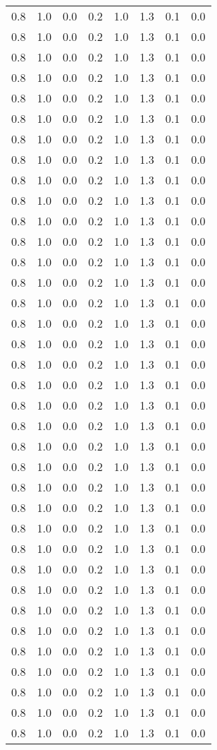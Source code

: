 \begin{tabular}{L{1in}|L{1in}|L{1in}|L{1in}|L{1in}|L{1in}|L{1in}|L{1in}}
0.8&1.0&0.0&0.2&1.0&1.3&0.1&0.0\\
0.8&1.0&0.0&0.2&1.0&1.3&0.1&0.0\\
0.8&1.0&0.0&0.2&1.0&1.3&0.1&0.0\\
0.8&1.0&0.0&0.2&1.0&1.3&0.1&0.0\\
0.8&1.0&0.0&0.2&1.0&1.3&0.1&0.0\\
0.8&1.0&0.0&0.2&1.0&1.3&0.1&0.0\\
0.8&1.0&0.0&0.2&1.0&1.3&0.1&0.0\\
0.8&1.0&0.0&0.2&1.0&1.3&0.1&0.0\\
0.8&1.0&0.0&0.2&1.0&1.3&0.1&0.0\\
0.8&1.0&0.0&0.2&1.0&1.3&0.1&0.0\\
0.8&1.0&0.0&0.2&1.0&1.3&0.1&0.0\\
0.8&1.0&0.0&0.2&1.0&1.3&0.1&0.0\\
0.8&1.0&0.0&0.2&1.0&1.3&0.1&0.0\\
0.8&1.0&0.0&0.2&1.0&1.3&0.1&0.0\\
0.8&1.0&0.0&0.2&1.0&1.3&0.1&0.0\\
0.8&1.0&0.0&0.2&1.0&1.3&0.1&0.0\\
0.8&1.0&0.0&0.2&1.0&1.3&0.1&0.0\\
0.8&1.0&0.0&0.2&1.0&1.3&0.1&0.0\\
0.8&1.0&0.0&0.2&1.0&1.3&0.1&0.0\\
0.8&1.0&0.0&0.2&1.0&1.3&0.1&0.0\\
0.8&1.0&0.0&0.2&1.0&1.3&0.1&0.0\\
0.8&1.0&0.0&0.2&1.0&1.3&0.1&0.0\\
0.8&1.0&0.0&0.2&1.0&1.3&0.1&0.0\\
0.8&1.0&0.0&0.2&1.0&1.3&0.1&0.0\\
0.8&1.0&0.0&0.2&1.0&1.3&0.1&0.0\\
0.8&1.0&0.0&0.2&1.0&1.3&0.1&0.0\\
0.8&1.0&0.0&0.2&1.0&1.3&0.1&0.0\\
0.8&1.0&0.0&0.2&1.0&1.3&0.1&0.0\\
0.8&1.0&0.0&0.2&1.0&1.3&0.1&0.0\\
0.8&1.0&0.0&0.2&1.0&1.3&0.1&0.0\\
0.8&1.0&0.0&0.2&1.0&1.3&0.1&0.0\\
0.8&1.0&0.0&0.2&1.0&1.3&0.1&0.0\\
0.8&1.0&0.0&0.2&1.0&1.3&0.1&0.0\\
0.8&1.0&0.0&0.2&1.0&1.3&0.1&0.0\\
0.8&1.0&0.0&0.2&1.0&1.3&0.1&0.0\\
0.8&1.0&0.0&0.2&1.0&1.3&0.1&0.0\\

\end{tabular}
